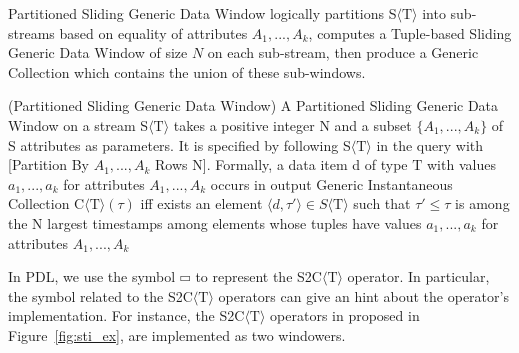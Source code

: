 Partitioned Sliding Generic Data Window logically partitions S$\langle\mathrm{T}\rangle$ into sub-streams based on equality of attributes $A_1, ..., A_k$, computes a Tuple-based Sliding Generic Data Window of size $N$ on each sub-stream, then produce a Generic Collection which contains the union of these sub-windows.

\begin{Definition}
(Partitioned Sliding Generic Data Window) A Partitioned Sliding Generic Data Window on a stream S$\langle\mathrm{T}\rangle$ takes a positive integer N and a subset $\{A_1, ..., A_k\}$ of S attributes as parameters. It is specified by following S$\langle\mathrm{T}\rangle$ in the query with [Partition By $A_1, ..., A_k$ Rows N].
Formally, a data item d of type $\mathrm{T}$ with values $a_1, ..., a_k$ for attributes $A_1, ..., A_k$ occurs in output Generic Instantaneous Collection C$\langle\mathrm{T}\rangle(\tau)$ iff exists an element $\langle d,\tau' \rangle \in S\langle\mathrm{T}\rangle$ such that $\tau' \leq \tau$ is among the N largest timestamps among elements whose tuples have values $a_1, ..., a_k$ for attributes $A_1, ..., A_k$
\end{Definition}

\noindent
In PDL, we use the symbol $\hrectangle$ to represent the S2C$\langle\mathrm{T}\rangle$ operator. 
In particular, the symbol related to the S2C$\langle\mathrm{T}\rangle$ operators can give an hint about the operator's implementation.
For instance, the S2C$\langle\mathrm{T}\rangle$ operators in proposed in Figure~\ref{fig:sti_ex}, are implemented as two windowers.

